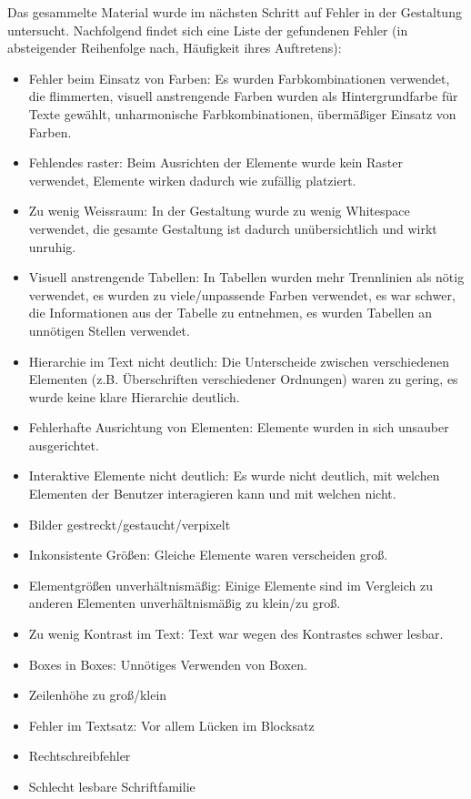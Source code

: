 Das gesammelte Material wurde im nächsten Schritt auf Fehler in der Gestaltung untersucht. Nachfolgend findet sich eine Liste der gefundenen Fehler (in absteigender Reihenfolge nach, Häufigkeit ihres Auftretens):

\begin{itemize}
	\item Fehler beim Einsatz von Farben: Es wurden Farbkombinationen verwendet, die flimmerten, visuell anstrengende Farben wurden als Hintergrundfarbe für Texte gewählt, unharmonische Farbkombinationen, übermäßiger Einsatz von Farben.
	\item Fehlendes raster: Beim Ausrichten der Elemente wurde kein Raster verwendet, Elemente wirken dadurch wie zufällig platziert.
	\item Zu wenig Weissraum: In der Gestaltung wurde zu wenig Whitespace verwendet, die gesamte Gestaltung ist dadurch unübersichtlich und wirkt unruhig.
	\item Visuell anstrengende Tabellen: In Tabellen wurden mehr Trennlinien als nötig verwendet, es wurden zu viele/unpassende Farben verwendet, es war schwer, die Informationen aus der Tabelle zu entnehmen, es wurden Tabellen an unnötigen Stellen verwendet.
	\item Hierarchie im Text nicht deutlich: Die Unterscheide zwischen verschiedenen Elementen (z.B. Überschriften verschiedener Ordnungen) waren zu gering, es wurde keine klare Hierarchie deutlich.
	\item Fehlerhafte Ausrichtung von Elementen: Elemente wurden in sich unsauber ausgerichtet.
	\item Interaktive Elemente nicht deutlich: Es wurde nicht deutlich, mit welchen Elementen der Benutzer interagieren kann und mit welchen nicht.
	\item Bilder gestreckt/gestaucht/verpixelt
	\item Inkonsistente Größen: Gleiche Elemente waren verscheiden groß.
	\item Elementgrößen unverhältnismäßig: Einige Elemente sind im Vergleich zu anderen Elementen unverhältnismäßig zu klein/zu groß.
	\item Zu wenig Kontrast im Text: Text war wegen des Kontrastes schwer lesbar.
	\item Boxes in Boxes: Unnötiges Verwenden von Boxen.
	\item Zeilenhöhe zu groß/klein
	\item Fehler im Textsatz: Vor allem Lücken im Blocksatz
	\item Rechtschreibfehler
	\item Schlecht lesbare Schriftfamilie
\end{itemize}


